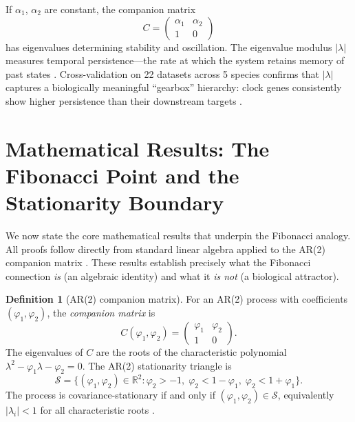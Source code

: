 \documentclass[11pt,letterpaper]{article}
\theoremstyle{definition}
\newtheorem{definition}[theorem]{Definition}
\theoremstyle{remark}
\begin{document}
If $\alpha_1$, $\alpha_2$ are constant, the companion matrix
\begin{equation}
C = \begin{pmatrix} \alpha_1 & \alpha_2 \\ 1 & 0 \end{pmatrix}
\end{equation}
has eigenvalues determining stability and oscillation. The eigenvalue modulus $|\lambda|$ measures temporal persistence---the rate at which the system retains memory of past states \citep{hamilton1994time}. Cross-validation on 22 datasets across 5 species confirms that $|\lambda|$ captures a biologically meaningful ``gearbox'' hierarchy: clock genes consistently show higher persistence than their downstream targets \citep{whiteside2026paper_a}.

\section{Mathematical Results: The Fibonacci Point and the Stationarity Boundary}
\label{sec:math}

We now state the core mathematical results that underpin the Fibonacci analogy. All proofs follow directly from standard linear algebra applied to the AR(2) companion matrix \citep{hamilton1994time}. These results establish precisely what the Fibonacci connection \emph{is} (an algebraic identity) and what it \emph{is not} (a biological attractor).

\begin{definition}[AR(2) companion matrix]\label{def:companion}
For an AR(2) process with coefficients $(\varphi_1, \varphi_2)$, the \emph{companion matrix} is
\[
  C(\varphi_1, \varphi_2) = \begin{pmatrix} \varphi_1 & \varphi_2 \\ 1 & 0 \end{pmatrix}.
\]
The eigenvalues of $C$ are the roots of the characteristic polynomial $\lambda^2 - \varphi_1\lambda - \varphi_2 = 0$. The AR(2) stationarity triangle is
\[
  \mathcal{S} = \bigl\{ (\varphi_1, \varphi_2) \in \mathbb{R}^2
    : \varphi_2 > -1,\; \varphi_2 < 1 - \varphi_1,\; \varphi_2 < 1 + \varphi_1 \bigr\}.
\]
The process is covariance-stationary if and only if $(\varphi_1,\varphi_2)\in\mathcal{S}$, equivalently $|\lambda_i|<1$ for all characteristic roots \citep{hamilton1994time}.
\end{definition}
\end{document}
